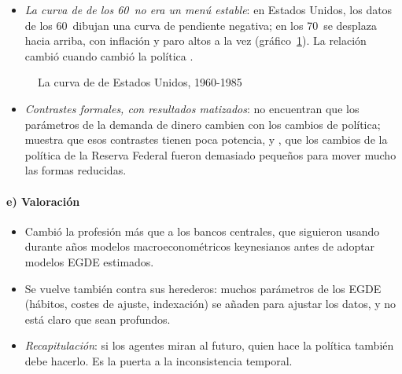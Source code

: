 \documentclass[11pt]{article}
\begin{document}
\begin{itemize}
\item \emph{La curva de  de los 60~no era un menú estable}: en Estados Unidos, los datos de los 60~dibujan una curva de pendiente negativa; en los 70~se desplaza hacia arriba, con inflación y paro altos a la vez (gráfico~\ref{fig:phillips-eeuu-1960-1985}). La relación cambió cuando cambió la política .
\end{itemize}

\begin{figure}[H]
\centering
\caption{La curva de  de Estados Unidos, 1960-1985}\label{fig:phillips-eeuu-1960-1985}
\end{figure}

\begin{itemize}
\item \emph{Contrastes formales, con resultados matizados}: \textcite{FaveroHendry1992Testing} no encuentran que los parámetros de la demanda de dinero cambien con los cambios de política; \textcite{Linde2001Testing} muestra que esos contrastes tienen poca potencia, y \textcite{Rudebusch2005Assessing}, que los cambios de la política de la Reserva Federal fueron demasiado pequeños para mover mucho las formas reducidas.
\end{itemize}

\paragraph{e) Valoración}

\begin{itemize}
\item Cambió la profesión más que a los bancos centrales, que siguieron usando durante años modelos macroeconométricos keynesianos antes de adoptar modelos EGDE estimados.
\item Se vuelve también contra sus herederos: muchos parámetros de los EGDE (hábitos, costes de ajuste, indexación) se añaden para ajustar los datos, y no está claro que sean profundos\nocite{ChariKehoeMcGrattan2009New}.
\item \emph{Recapitulación}: si los agentes miran al futuro, quien hace la política también debe hacerlo. Es la puerta a la inconsistencia temporal.
\end{itemize}

\end{document}
